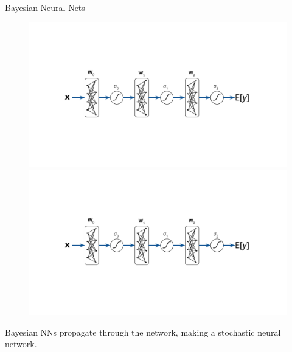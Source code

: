 \documentclass[lualatex, aspectratio=169]{beamer}
\begin{document}
\begin{frame}{Bayesian Neural Nets}

  \begin{figure}
    \includegraphics[page=1, trim={3cm 4.5cm 3cm 4.5cm}, clip, width=0.6\pagewidth]{assets/pictures.pdf}
    \includegraphics[page=3, trim={3cm 4.5cm 3cm 4.5cm}, clip, width=0.6\pagewidth]{assets/pictures.pdf}
  \end{figure}

  Bayesian NNs propagate  through the network, making a stochastic neural network. 

\end{frame}
\end{document}
